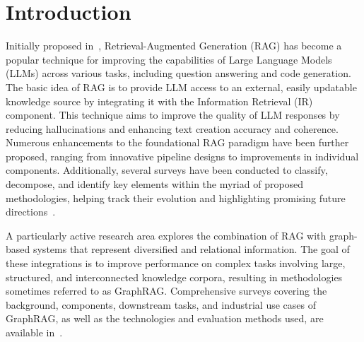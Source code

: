 \documentclass{article}
\begin{document}
\section{Introduction}
Initially proposed in~\cite{guu2020retrieval, lewis2020retrieval}, Retrieval-Augmented Generation (RAG) has become a popular technique for improving the capabilities of Large Language Models (LLMs) across various tasks, including question answering and code generation.  The basic idea of RAG is to provide LLM access to an external, easily updatable knowledge source by integrating it with the Information Retrieval (IR) component. This technique aims to improve the quality of LLM responses by reducing hallucinations and enhancing text creation accuracy and coherence. Numerous enhancements to the foundational RAG paradigm have been further proposed, ranging from innovative pipeline designs to improvements in individual components. Additionally, several surveys have been conducted to classify, decompose, and identify key elements within the myriad of proposed methodologies, helping track their evolution and highlighting promising future directions~\cite{zhao2024retrieval, fan2024survey, gao2023retrieval, gupta2024comprehensive}. 

A particularly active research area explores the combination of RAG with graph-based systems that represent diversified and relational information. The goal of these integrations is to improve performance on complex tasks involving large, structured, and interconnected knowledge corpora, resulting in methodologies sometimes referred to as GraphRAG. Comprehensive surveys covering the background, components, downstream tasks, and industrial use cases of GraphRAG, as well as the technologies and evaluation methods used, are available in~\cite{peng2024graph, han2024retrieval}. 
\end{document}
